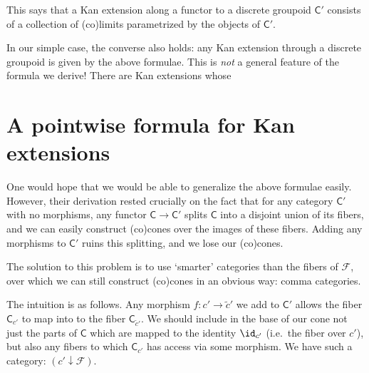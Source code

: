 \documentclass[main.tex]{subfiles}
\begin{document}
This says that a Kan extension along a functor to a discrete groupoid $\mathsf{C}'$ consists of a collection of (co)limits parametrized by the objects of $\mathsf{C}'$.

\begin{note}
  In our simple case, the converse also holds: any Kan extension through a discrete groupoid is given by the above formulae. This is \emph{not} a general feature of the formula we derive! There are Kan extensions whose
\end{note}

\section{A pointwise formula for Kan extensions}
\label{sec:a_pointwise_formula_for_kan_extensions}

One would hope that we would be able to generalize the above formulae easily. However, their derivation rested crucially on the fact that for any category $\mathsf{C}'$ with no morphisms, any functor $\mathsf{C} \to \mathsf{C}'$ splits $\mathsf{C}$ into a disjoint union of its fibers, and we can easily construct (co)cones over the images of these fibers. Adding any morphisms to $\mathsf{C}'$ ruins this splitting, and we lose our (co)cones.

The solution to this problem is to use `smarter' categories than the fibers of $\mathcal{F}$, over which we can still construct (co)cones in an obvious way: comma categories.

The intuition is as follows. Any morphism $f\colon c' \to \tilde{c}'$ we add to $\mathsf{C}'$ allows the fiber $\mathsf{C}_{c'}$ to map into to the fiber $\mathsf{C}_{\tilde{c}'}$. We should include in the base of our cone not just the parts of $\mathsf{C}$ which are mapped to the identity $\id_{c'}$ (i.e.\ the fiber over $c'$), but also any fibers to which $\mathsf{C}_{c'}$ has access via some morphism. We have such a category: $(c' \downarrow \mathcal{F})$.
\end{document}
